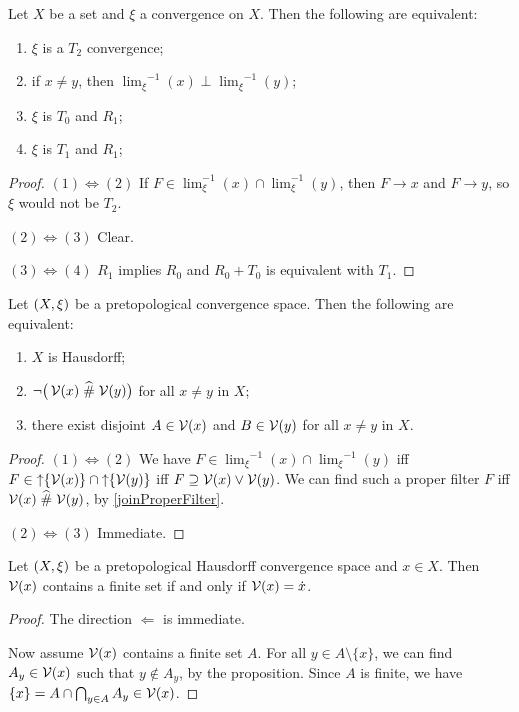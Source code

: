 \begin{proposition}
Let $X$ be a set and $\xi$ a convergence on $X$. Then the following are equivalent:
\begin{enumerate}
\item $\xi$ is a $T_2$ convergence;
\item if $x \neq y$, then ${\lim_\xi}^{-1}(x)\perp {\lim_\xi}^{-1}(y)$;
\item $\xi$ is $T_0$ and $R_1$;
\item $\xi$ is $T_1$ and $R_1$;
\end{enumerate}
\end{proposition}
\begin{proof}
$(1) \Leftrightarrow (2)$ If $F \in \lim_\xi^{-1}(x)\cap \lim_\xi^{-1}(y)$, then $F \to x$ and $F\to y$, so $\xi$ would not be $T_2$.

$(2) \Leftrightarrow (3)$ Clear.

$(3) \Leftrightarrow (4)$ $R_1$ implies $R_0$ and $R_0+T_0$ is equivalent with $T_1$.
\end{proof}

\begin{proposition} \label{pretopologicalHausdorff}
Let $\sSet{X,\xi}$ be a pretopological convergence space. Then the following are equivalent:
\begin{enumerate}
\item $X$ is Hausdorff;
\item $\neg\big(\operatorname{\mathcal{V}}(x) \mathrel{\widehat{\#}} \operatorname{\mathcal{V}}(y)\big)$ for all $x\neq y$ in $X$;
\item there exist disjoint $A\in \operatorname{\mathcal{V}}(x)$ and $B\in \operatorname{\mathcal{V}}(y)$ for all $x\neq y$ in $X$.
\end{enumerate}
\end{proposition}
\begin{proof}
$(1) \Leftrightarrow (2)$ We have $F\in {\lim_\xi}^{-1}(x)\cap {\lim_\xi}^{-1}(y)$ iff $F\in \operatorname{\uparrow} \{\operatorname{\mathcal{V}}(x)\} \cap \operatorname{\uparrow} \{\operatorname{\mathcal{V}}(y)\}$ iff $F \supseteq \operatorname{\mathcal{V}}(x)\vee \operatorname{\mathcal{V}}(y)$. We can find such a proper filter $F$ iff $\operatorname{\mathcal{V}}(x) \mathrel{\widehat{\#}} \operatorname{\mathcal{V}}(y)$, by \ref{joinProperFilter}.

$(2) \Leftrightarrow (3)$ Immediate.
\end{proof}
\begin{corollary}
Let $\sSet{X,\xi}$ be a pretopological Hausdorff convergence space and $x\in X$. Then $\operatorname{\mathcal{V}}(x)$ contains a finite set \textup{if and only if} $\operatorname{\mathcal{V}}(x) = \dot{x}$.
\end{corollary}
\begin{proof}
The direction $\Leftarrow$ is immediate.

Now assume $\operatorname{\mathcal{V}}(x)$ contains a finite set $A$. For all $y\in A\setminus \{x\}$, we can find $A_y\in \operatorname{\mathcal{V}}(x)$ such that $y\notin A_y$, by the proposition. Since $A$ is finite, we have $\{x\} = A\cap \bigcap_{y\in A}A_y \in \operatorname{\mathcal{V}}(x)$.
\end{proof}

